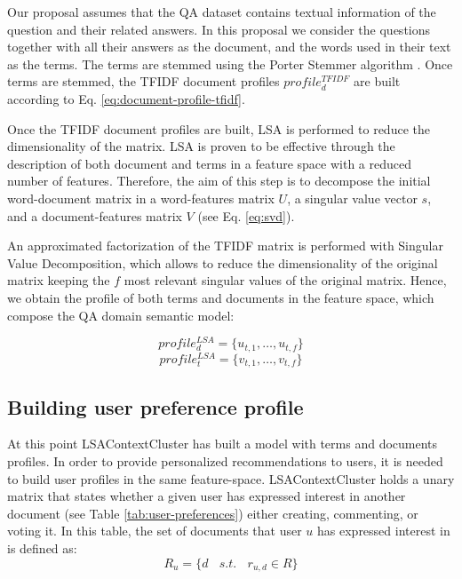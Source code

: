 \documentclass[preprint]{elsarticle}
\begin{document}
\begin{spacing}{1.5}
Our proposal assumes that the QA dataset contains textual information of the question and their related answers. In this proposal we consider the questions together with all their answers as the document, and the words used in their text as the terms. The terms are stemmed using the Porter Stemmer algorithm \citep{Porter1980}. Once terms are stemmed, the TFIDF document profiles $profile^{TFIDF}_{d}$ are built according to Eq. \ref{eq:document-profile-tfidf}.

Once the TFIDF document profiles are built, LSA is performed to reduce the dimensionality of the matrix. LSA is proven to be effective through the description of both document and terms in a feature space with a reduced number of features. Therefore, the aim of this step is to decompose the initial word-document matrix in a word-features matrix $U$, a singular value vector $s$, and a document-features matrix $V$ (see Eq. \ref{eq:svd}).

An approximated factorization of the TFIDF matrix is performed with Singular Value Decomposition, which allows to reduce the dimensionality of the original matrix keeping the $f$ most relevant singular values of the original matrix. Hence, we obtain the profile of both terms and documents in the feature space, which compose the QA domain semantic model:

\begin{equation}
	profile^{LSA}_d = \{ u_{t,1},\dots, u_{t,f}\}
\end{equation}
\begin{equation}
	profile^{LSA}_t = \{ v_{t,1},\dots, v_{t,f}\}
\end{equation}

\subsection{Building user preference profile}

At this point LSAContextCluster has built a model with terms and documents profiles. In order to provide personalized recommendations to users, it is needed to build user profiles in the same feature-space. LSAContextCluster holds a unary matrix that states whether a given user has expressed interest in another document (see Table \ref{tab:user-preferences}) either creating, commenting, or voting it. In this table, the set of documents that user $u$ has expressed interest in is defined as:
\begin{equation}
	R_{u} = \{d ~~~~s.t.~~~~r_{u,d} \in R \}
\end{equation}


\end{spacing}
\end{document}
